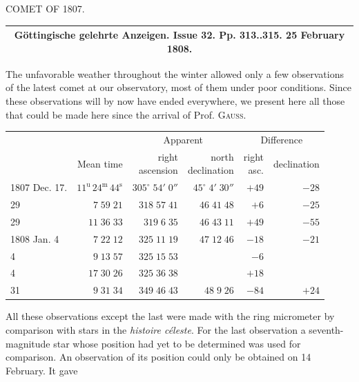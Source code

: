 \begin{center}
COMET OF 1807.
\end{center}

\begin{center}
\fontsize{10}{12}\selectfont\begin{tabular}{c}
\hline
Göttingische gelehrte Anzeigen. Issue 32. Pp. 313..315. 25 February 1808. \\
\hline
\end{tabular}
\end{center}

The unfavorable weather throughout the winter allowed only a few observations of the latest comet at our observatory, most of them under poor conditions. Since these observations will by now have ended everywhere, we present here all those that could be made here since the arrival of Prof. \textsc{Gauss}.


\begin{center}\fontsize{9}{11}\selectfont\setlength{\tabcolsep}{2pt}\renewcommand{\arraystretch}{1.15}\begin{tabular}{lrrrrr}
& & \multicolumn{2}{c}{Apparent} & \multicolumn{2}{c}{Difference}\\
& Mean time & \shortstack{right\\ascension} & \shortstack{north\\declination} & \shortstack{right\\asc.} & declination\\\hline
1807 Dec. 17. & $11^{\text{u}}\,24^{\text{m}}\,44^{\text{s}}$ & $305^\circ\;54'\;0''$ & $45^\circ\;4'\;30''$ & $+49$ & $-28$\\
29 & $7\;59\;21$ & $318\;57\;41$ & $46\;41\;48$ & $+6$ & $-25$\\
29 & $11\;36\;33$ & $319\;6\;35$ & $46\;43\;11$ & $+49$ & $-55$\\
1808 Jan. 4 & $7\;22\;12$ & $325\;11\;19$ & $47\;12\;46$ & $-18$ & $-21$\\
4 & $9\;13\;57$ & $325\;15\;53$ & & $-6$ & \\
4 & $17\;30\;26$ & $325\;36\;38$ & & $+18$ & \\
31 & $9\;31\;34$ & $349\;46\;43$ & $48\;9\;26$ & $-84$ & $+24$\\
\end{tabular}\end{center}

\par\indent All these observations except the last were made with the ring micrometer by comparison with stars in the \emph{histoire céleste}. For the last observation a seventh-magnitude star whose position had yet to be determined was used for comparison. An observation of its position could only be obtained on 14 February. It gave


